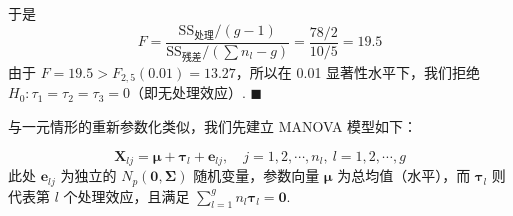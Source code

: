 于是
\[
F=\frac{\mathrm{SS}_{\text{处理}}/(g-1)}{\mathrm{SS}_{\text{残差}}\big/\left(\sum n_l-g\right)}=\frac{78/2}{10/5}=19.5
\]
由于 $F=19.5>F_{2,5}(0.01)=13.27$，所以在 0.01 显著性水平下，我们拒绝 $H_0: \tau_1=\tau_2=\tau_3=0$（即无处理效应）. \hfill$\blacksquare$


与一元情形的重新参数化类似，我们先建立 MANOVA 模型如下：

\begin{mvframe}
\label{eq:6-38}
\begin{equation}
\mathbf{X}_{lj}=\boldsymbol{\mu}+\boldsymbol{\tau}_l+\mathbf{e}_{lj},\quad j=1,2,\cdots,n_l,\ l=1,2,\cdots,g \tag{6-38}
\end{equation}
此处 $\mathbf{e}_{lj}$ 为独立的 $N_p(\mathbf{0},\boldsymbol{\Sigma})$ 随机变量，参数向量 $\boldsymbol{\mu}$ 为总均值（水平），而 $\boldsymbol{\tau}_l$ 则代表第 $l$ 个处理效应，且满足 $\sum\limits_{l=1}^g n_l\boldsymbol{\tau}_l=\mathbf{0}$.
\end{mvframe}
